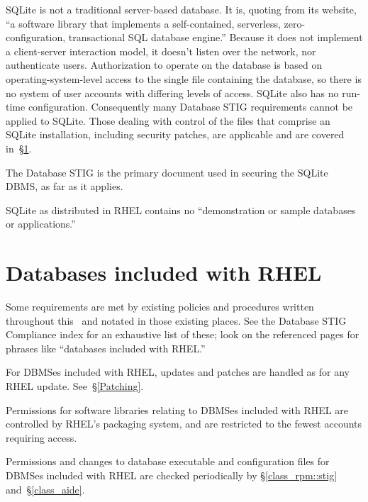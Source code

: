 SQLite is not a traditional server-based database. It is, quoting from its
website, ``a software library that implements a self-contained,
serverless, zero-configuration, transactional SQL database engine.''
Because it does not implement a client-server interaction model, it
doesn't listen over the network, nor authenticate users. Authorization to
operate on the database is based on operating-system-level access to the
single file containing the database, so there is no system of user
accounts with differing levels of access. SQLite also has no run-time
configuration. Consequently many Database STIG requirements cannot be
applied to SQLite. Those dealing with control of the files that comprise
an SQLite installation, including security patches, are applicable and are
covered in~\S\ref{dbms-with-rhel}.

%
The Database STIG is the primary document used in securing the SQLite
DBMS, as far as it applies.

%
SQLite as distributed in RHEL contains no ``demonstration or sample
data\-bases or applications.''





\section{Databases included with RHEL}
\label{dbms-with-rhel}

Some requirements are met by existing policies and procedures written
throughout this \CMITSPolicy\, and notated in those existing places. See
the Database STIG Compliance index for an exhaustive list of these; look
on the referenced pages for phrases like ``databases included with RHEL.''

%
For DBMSes included with RHEL, updates and patches are handled as for any
RHEL update. See~\S\ref{Patching}.

%
Permissions for software libraries relating to DBMSes included with RHEL
are controlled by RHEL's packaging system, and are restricted to the
fewest accounts requiring access. 

%
Permissions and changes to database executable and configuration files for
DBMSes included with RHEL are checked periodically by
\S\ref{class_rpm::stig} and~\S\ref{class_aide}.

